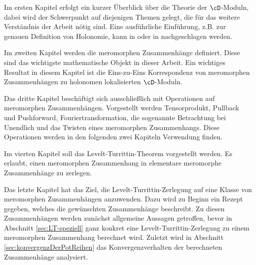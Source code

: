Im ersten Kapitel erfolgt ein kurzer Überblick über die Theorie der
$\cD$-Moduln, dabei wird der Schwerpunkt auf diejenigen Themen gelegt, die für
das weitere Verständnis der Arbeit nötig sind. Eine ausführliche Einführung,
z.B. zur genauen Definition von Holonomie, kann in \cite{sabbah_cimpa90} oder
in \cite{hotta2007d} nachgeschlagen werden.\\
\iffalse
  Im ersten Kapitel wird sehr knapp die Theorie der $\cD$-Moduln eingeführt, da
  uns diese im später sehr nützlich sein wird. Hier wurde, vor allem bei der
  Definition von holonomen $\cD$-Moduln, viel Hintergrund weggelassen, da
  dieser zum Verständnis dieser Arbeit nicht nötig ist.\\
\fi
\begin{comment} \end{comment}
Im zweiten Kapitel werden die meromorphen Zusammenhänge definiert.
Diese sind das wichtigste mathematische Objekt in dieser Arbeit.
Ein wichtiges Resultat in diesem Kapitel ist die Eins-zu-Eins Korrespondenz
von meromorphen Zusammenhängen zu holonomen lokalisierten $\cD$-Moduln.\\
\begin{comment} \end{comment}
Das dritte Kapitel beschäftigt sich ausschließlich mit Operationen auf
meromorphen Zusammenhängen.
Vorgestellt werden Tensorprodukt, Pullback und Pushforward,
Fouriertransformation, die sogenannte \glqq{}Betrachtung bei Unendlich\grqq{} und das Twisten
eines meromorphen Zusammenhangs.
Diese Operationen werden in den folgenden zwei Kapiteln Verwendung finden.\\
\begin{comment} \end{comment}
Im vierten Kapitel soll das Levelt-Turrittin-Theorem vorgestellt werden.
Es erlaubt, einen meromorphen Zusammenhang in elementare meromorphe
Zusammenhänge zu zerlegen.\\
\begin{comment} \end{comment}
Das letzte Kapitel hat das Ziel, die Levelt-Turrittin-Zerlegung auf eine Klasse
von meromorphen Zusammenhängen anzuwenden.
Dazu wird zu Beginn ein Rezept gegeben, welches die gewünschten Zusammenhänge
beschreibt.
Zu diesen Zusammenhängen werden zunächst allgemeine Aussagen getroffen, bevor
in Abschnitt \ref{sec:LT-speziell} ganz konkret eine Levelt-Turrittin-Zerlegung
zu einem meromorphen Zusammenhang berechnet wird.
Zuletzt wird in Abschnitt \ref{sec:konvergenzDerPotReihen} das
Konvergenzverhalten der berechneten Zusammenhänge analysiert.

\begin{comment}
Ich möchte diese Stelle nutzen, um Herrn Prof. Dr. Hien dafür zu danken, dass
er mir ermöglicht hat, mich mit diesem Thema zu beschäftigen.
Auch bedanke ich mich für die hervorragende Betreuung, welche diese Arbeit erst
ermöglicht hat.
\end{comment}


